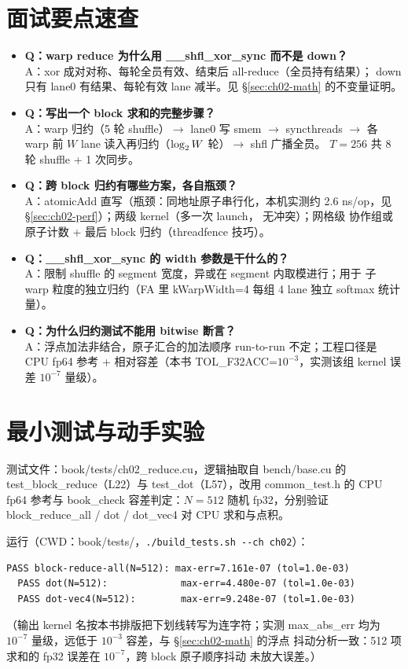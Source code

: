 \section{面试要点速查}

\begin{itemize}
\item \textbf{Q：warp reduce 为什么用 \_\_shfl\_xor\_sync 而不是 down？}\\
  A：xor 成对对称、每轮全员有效、结束后 all-reduce（全员持有结果）；
  down 只有 lane0 有结果、每轮有效 lane 减半。见 \S\ref{sec:ch02-math}
  的不变量证明。
\item \textbf{Q：写出一个 block 求和的完整步骤？}\\
  A：warp 归约（5 轮 shuffle）$\to$ lane0 写 smem $\to$ syncthreads $\to$
  各 warp 前 $W$ lane 读入再归约（$\log\sb 2 W$ 轮）$\to$ shfl 广播全员。
  $T=256$ 共 8 轮 shuffle + 1 次同步。
\item \textbf{Q：跨 block 归约有哪些方案，各自瓶颈？}\\
  A：atomicAdd 直写（瓶颈：同地址原子串行化，本机实测约
  2.6 ns/op，见 \S\ref{sec:ch02-perf}）；两级 kernel（多一次 launch，
  无冲突）；网格级
  协作组或原子计数 + 最后 block 归约（threadfence 技巧）。
\item \textbf{Q：\_\_shfl\_xor\_sync 的 width 参数是干什么的？}\\
  A：限制 shuffle 的 segment 宽度，异或在 segment 内取模进行；用于
  子 warp 粒度的独立归约（FA 里 kWarpWidth=4 每组 4 lane 独立 softmax
  统计量）。
\item \textbf{Q：为什么归约测试不能用 bitwise 断言？}\\
  A：浮点加法非结合，原子汇合的加法顺序 run-to-run 不定；工程口径是
  CPU fp64 参考 + 相对容差（本书 TOL\_F32ACC=$10^{-3}$，实测该组 kernel
  误差 $10^{-7}$ 量级）。
\end{itemize}

\section{最小测试与动手实验}

测试文件：book/tests/ch02\_reduce.cu，逻辑抽取自 bench/base.cu 的
test\_block\_reduce（L22）与 test\_dot（L57），改用 common\_test.h 的
CPU fp64 参考与 book\_check 容差判定：$N = 512$ 随机 fp32，分别验证
block\_reduce\_all / dot / dot\_vec4 对 CPU 求和与点积。

运行（CWD：book/tests/，\texttt{.\allowbreak{}/\allowbreak{}build\_\allowbreak{}tests.\allowbreak{}sh -{}-ch ch02}）：
\begin{lstlisting}[style=console]
  PASS block-reduce-all(N=512): max-err=7.161e-07 (tol=1.0e-03)
  PASS dot(N=512):             max-err=4.480e-07 (tol=1.0e-03)
  PASS dot-vec4(N=512):        max-err=9.248e-07 (tol=1.0e-03)
\end{lstlisting}
（输出 kernel 名按本书排版把下划线转写为连字符；实测 max\_abs\_err 均为
$10^{-7}$ 量级，远低于 $10^{-3}$ 容差，与 \S\ref{sec:ch02-math} 的浮点
抖动分析一致：512 项求和的 fp32 误差在 $10^{-7}$，跨 block 原子顺序抖动
未放大误差。）

